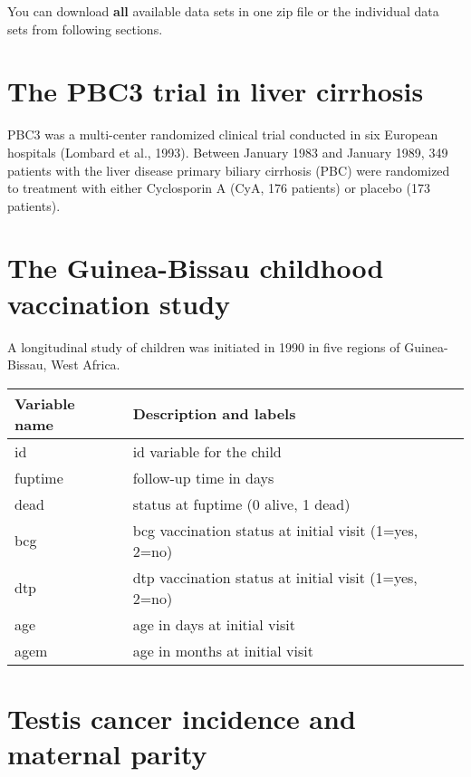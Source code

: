 \documentclass[
  letterpaper,
  DIV=11,
  numbers=noendperiod]{scrreprt}
\begin{document}
You can download \textbf{all} available data sets in one zip file or the
individual data sets from following sections.

\hypertarget{the-pbc3-trial-in-liver-cirrhosis}{%
\section{The PBC3 trial in liver
cirrhosis}\label{the-pbc3-trial-in-liver-cirrhosis}}

PBC3 was a multi-center randomized clinical trial conducted in six
European hospitals (Lombard et al., 1993). Between January 1983 and
January 1989, 349 patients with the liver disease primary biliary
cirrhosis (PBC) were randomized to treatment with either Cyclosporin A
(CyA, 176 patients) or placebo (173 patients).

\hypertarget{the-guinea-bissau-childhood-vaccination-study}{%
\section{The Guinea-Bissau childhood vaccination
study}\label{the-guinea-bissau-childhood-vaccination-study}}

A longitudinal study of children was initiated in 1990 in five regions
of Guinea-Bissau, West Africa.

\begin{longtable}[]{@{}ll@{}}
\toprule()
Variable name & Description and labels \\
\midrule()
\endhead
id & id variable for the child \\
fuptime & follow-up time in days \\
dead & status at fuptime (0 alive, 1 dead) \\
bcg & bcg vaccination status at initial visit (1=yes, 2=no) \\
dtp & dtp vaccination status at initial visit (1=yes, 2=no) \\
age & age in days at initial visit \\
agem & age in months at initial visit \\
\bottomrule()
\end{longtable}

\hypertarget{testis-cancer-incidence-and-maternal-parity}{%
\section{Testis cancer incidence and maternal
parity}\label{testis-cancer-incidence-and-maternal-parity}}
\end{document}
